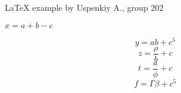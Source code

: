 \documentclass[11pt]{article}
\begin{document}
\begin{center}
\Large{
\LaTeX{} example by Uspenkiy A., group 202}
\end{center}
\lipsum[1]
$x = a + b - c$

\lipsum[2]
$$y = ab + c^5$$
\lipsum[3]
\begin{equation}
	z = \frac{\rho}{b} + c
\end{equation}
\lipsum[3]
\begin{equation}
	t = \frac{a}{\phi} + c
\end{equation}
$$f = \Gamma\beta + c^5$$
\end{document}
